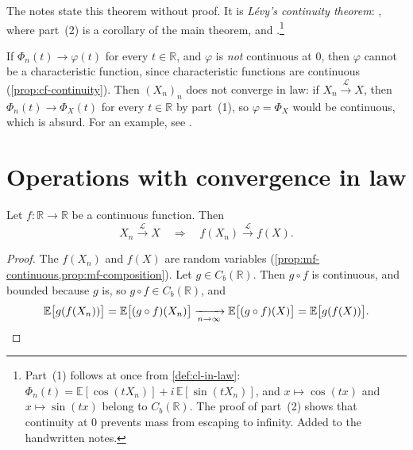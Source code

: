 The notes state this theorem without proof. It is \emph{L\'evy's continuity theorem}:
\citet[Section~26, ``The Continuity Theorem'']{billingsley}, where part~(2) is a corollary of the
main theorem, and \citet[Section~3.3]{durrett}.\footnote{Part~(1) follows at once from
\cref{def:cl-in-law}: $\Phi_n(t)=\mathbb E[\cos(tX_n)]+i\,\mathbb E[\sin(tX_n)]$, and
$x\mapsto\cos(tx)$ and $x\mapsto\sin(tx)$ belong to $C_b(\mathbb R)$. The proof of part~(2)
shows that continuity at $0$ prevents mass from escaping to infinity. Added to the handwritten
notes.}

\begin{remark}[Warning]\label{rem:cl-levy-warning}
If $\Phi_n(t)\to\varphi(t)$ for every $t\in\mathbb R$, and $\varphi$ is \emph{not} continuous at
$0$, then $\varphi$ cannot be a characteristic function, since characteristic functions are
continuous (\cref{prop:cf-continuity}). Then $(X_n)_n$ does not converge in law: if
$X_n\xrightarrow{\mathcal L}X$, then $\Phi_n(t)\to\Phi_X(t)$ for every $t\in\mathbb R$ by part~(1),
so $\varphi=\Phi_X$ would be continuous, which is absurd. For an example, see
.
\end{remark}

\section{Operations with convergence in law}\label{sec:cl-operations}

\begin{proposition}[Continuity]\label{prop:cl-continuous-mapping}
Let $f:\mathbb R\to\mathbb R$ be a continuous function. Then
\[
  X_n\xrightarrow{\mathcal L}X\quad\Longrightarrow\quad f(X_n)\xrightarrow{\mathcal L}f(X) .
\]
\end{proposition}

\begin{proof}
The $f(X_n)$ and $f(X)$ are random variables (\cref{prop:mf-continuous,prop:mf-composition}).
Let $g\in C_b(\mathbb R)$. Then $g\circ f$ is continuous, and bounded because $g$ is, so
$g\circ f\in C_b(\mathbb R)$, and
\[
  \mathbb E\big[g(f(X_n))\big]=\mathbb E\big[(g\circ f)(X_n)\big]\xrightarrow[n\to\infty]{}
  \mathbb E\big[(g\circ f)(X)\big]=\mathbb E\big[g(f(X))\big] .\qedhere
\]
\end{proof}

